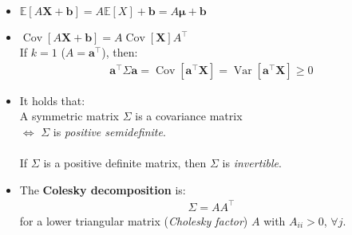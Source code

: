 \documentclass[a4paper,landscape,8pt,fleqn]{scrartcl}
\renewcommand{\emph}[1]{\textbf{#1}}
\DeclareMathOperator{\Var}{Var}				%
\DeclareMathOperator{\Cov}{Cov}				%
\begin{document}
\begin{multicols*}{3}
\begin{itemize}
\begin{itemize}
\item $\mathbb{E}[A \bm X + \bm b] = A \mathbb{E}[X] + \bm b = A \bm \mu + \bm b$
\item $\Cov[A \bm X + \bm b] = A \Cov[\bm X] A^\top$ \\
If $k=1$ ($A = \bm a^\top$), then:
\begin{align*}
\bm a^\top \Sigma \bm a = \Cov[\bm a^\top \bm X] = \Var[\bm a^\top \bm X] \geq 0
\end{align*}
\item It holds that: \\
A symmetric matrix $\Sigma$ is a covariance matrix \\
$\iff$ $\Sigma$ is \textit{positive semidefinite}. \\ \\
If $\Sigma$ is a positive definite matrix, then $\Sigma$ is \textit{invertible}.
\item The \emph{Colesky decomposition} is:
\begin{align*}
\Sigma = A A^\top
\end{align*}
for a lower triangular matrix (\textit{Cholesky factor}) $A$ with $A_{ii} > 0$, $\forall j$.
\end{itemize}
\end{itemize}


\end{multicols*}
\end{document}
